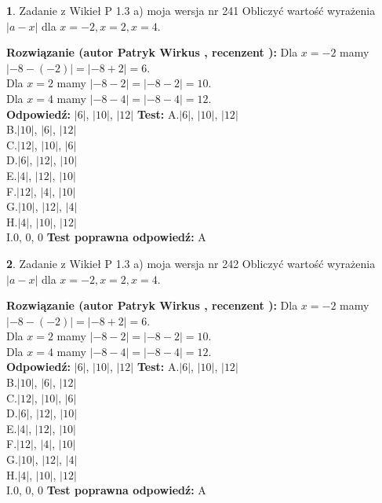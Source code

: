\documentclass[12pt, a4paper]{article}
\theoremstyle{definition} %
\newtheorem{zad}{}
\newcommand{\zadStart}[1]{\begin{zad}#1\newline}
\newcommand{\zadStop}{\end{zad}}
\newcommand{\rozwStart}[2]{\noindent \textbf{Rozwiązanie (autor #1 , recenzent #2): }\newline}
\newcommand{\rozwStop}{\newline}
\newcommand{\odpStart}{\noindent \textbf{Odpowiedź:}\newline}
\newcommand{\odpStop}{\newline}
\newcommand{\testStart}{\noindent \textbf{Test:}\newline}
\newcommand{\testStop}{\newline}
\newcommand{\kluczStart}{\noindent \textbf{Test poprawna odpowiedź:}\newline}
\newcommand{\kluczStop}{\newline}
\begin{document}
\zadStart{Zadanie z Wikieł P 1.3 a) moja wersja nr 241}
Obliczyć wartość wyrażenia $|a - x|$ dla $x=-2,x=2,x=4$.
\zadStop
\rozwStart{Patryk Wirkus}{}
Dla $x = -2$ mamy $|-8 - (-2)| = |-8 + 2| = 6$.\\
Dla $x = 2$ mamy $|-8 - 2| = |-8 - 2| = 10$.\\
Dla $x = 4$ mamy $|-8 - 4| = |-8 - 4| = 12$.\\
\rozwStop
\odpStart
$|6|$, $|10|$, $|12|$
\odpStop
\testStart
A.$|6|$, $|10|$, $|12|$\\
B.$|10|$, $|6|$, $|12|$\\
C.$|12|$, $|10|$, $|6|$\\
D.$|6|$, $|12|$, $|10|$\\
E.$|4|$, $|12|$, $|10|$\\
F.$|12|$, $|4|$, $|10|$\\
G.$|10|$, $|12|$, $|4|$\\
H.$|4|$, $|10|$, $|12|$\\
I.$0$, $0$, $0$
\testStop
\kluczStart
A
\kluczStop



\zadStart{Zadanie z Wikieł P 1.3 a) moja wersja nr 242}
Obliczyć wartość wyrażenia $|a - x|$ dla $x=-2,x=2,x=4$.
\zadStop
\rozwStart{Patryk Wirkus}{}
Dla $x = -2$ mamy $|-8 - (-2)| = |-8 + 2| = 6$.\\
Dla $x = 2$ mamy $|-8 - 2| = |-8 - 2| = 10$.\\
Dla $x = 4$ mamy $|-8 - 4| = |-8 - 4| = 12$.\\
\rozwStop
\odpStart
$|6|$, $|10|$, $|12|$
\odpStop
\testStart
A.$|6|$, $|10|$, $|12|$\\
B.$|10|$, $|6|$, $|12|$\\
C.$|12|$, $|10|$, $|6|$\\
D.$|6|$, $|12|$, $|10|$\\
E.$|4|$, $|12|$, $|10|$\\
F.$|12|$, $|4|$, $|10|$\\
G.$|10|$, $|12|$, $|4|$\\
H.$|4|$, $|10|$, $|12|$\\
I.$0$, $0$, $0$
\testStop
\kluczStart
A
\kluczStop
\end{document}
